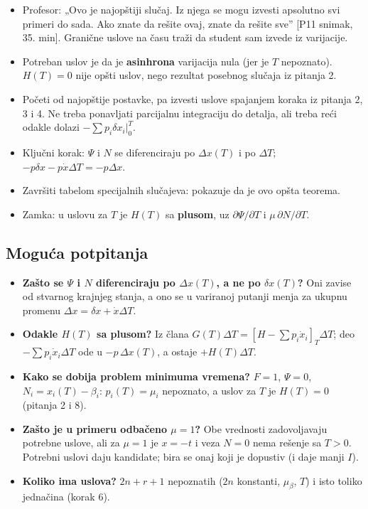\documentclass[11pt,a4paper,parskip=half,headsepline,numbers=noenddot]{scrartcl}
\DeclareRobustCommand{\izvor}[1]{{\small\color{izvorC}[#1]}}
\begin{document}
\begin{ispit}[{Pitanje 5}]
\begin{itemize}
\item Profesor: „Ovo je najopštiji slučaj. Iz njega se mogu izvesti apsolutno svi primeri do sada. Ako znate da rešite ovaj, znate da rešite sve'' \izvor{P11 snimak, 35. min}. Granične uslove na času traži da student sam izvede iz varijacije.
\item Potreban uslov je da je \textbf{asinhrona} varijacija nula (jer je \(T\) nepoznato). \(H(T) = 0\) nije opšti uslov, nego rezultat posebnog slučaja iz pitanja 2.
\item Početi od najopštije postavke, pa izvesti uslove spajanjem koraka iz pitanja 2, 3 i 4. Ne treba ponavljati parcijalnu integraciju do detalja, ali treba reći odakle dolazi \(-\sum p_i\delta x_i|_0^T\).
\item Ključni korak: \(\Psi\) i \(N\) se diferenciraju po \(\Delta x(T)\) i po \(\Delta T\); \(-p\delta x - p\dot x\Delta T = -p\Delta x\).
\item Završiti tabelom specijalnih slučajeva: pokazuje da je ovo opšta teorema.
\item Zamka: u uslovu za \(T\) je \(H(T)\) sa \textbf{plusom}, uz \(\partial\Psi/\partial T\) i \(\mu\,\partial N/\partial T\).
\end{itemize}
\end{ispit}

\subsection{Moguća potpitanja}

\begin{itemize}
\item \textbf{Zašto se \(\Psi\) i \(N\) diferenciraju po \(\Delta x(T)\), a ne po \(\delta x(T)\)?} Oni zavise od stvarnog krajnjeg stanja, a ono se u variranoj putanji menja za ukupnu promenu \(\Delta x = \delta x + \dot x\Delta T\).
\item \textbf{Odakle \(H(T)\) sa plusom?} Iz člana \(G(T)\Delta T = [H - \sum p_i\dot x_i]_T\Delta T\); deo \(-\sum p_i\dot x_i\Delta T\) ode u \(-p\,\Delta x(T)\), a ostaje \(+H(T)\Delta T\).
\item \textbf{Kako se dobija problem minimuma vremena?} \(F = 1\), \(\Psi = 0\), \(N_i = x_i(T) - \beta_i\): \(p_i(T) = \mu_i\) nepoznato, a uslov za \(T\) je \(H(T) = 0\) (pitanja 2 i 8).
\item \textbf{Zašto je u primeru odbačeno \(\mu = 1\)?} Obe vrednosti zadovoljavaju potrebne uslove, ali za \(\mu = 1\) je \(x = -t\) i veza \(N = 0\) nema rešenje sa \(T > 0\). Potrebni uslovi daju kandidate; bira se onaj koji je dopustiv (i daje manji \(I\)).
\item \textbf{Koliko ima uslova?} \(2n + r + 1\) nepoznatih (\(2n\) konstanti, \(\mu_\beta\), \(T\)) i isto toliko jednačina (korak 6).
\end{itemize}
\end{document}
